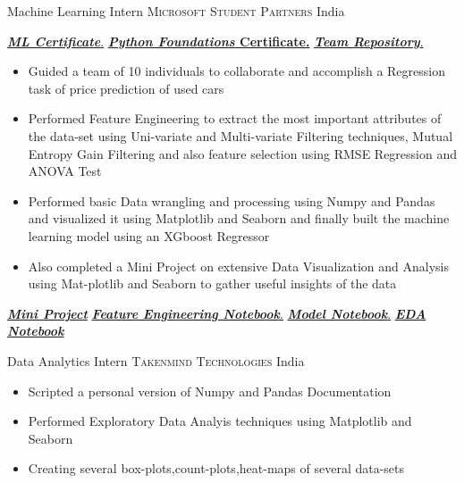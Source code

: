 \documentclass[11pt,a4paper,sans]{moderncv} %
\begin{document}
{Machine Learning Intern}
{\textsc{Microsoft Student Partners}}
{India}
{}
{
\href{https://github.com/teetangh/Kaustav-All-Certifications/blob/master/Artificial\%20Intelligence/MSP\%20ML\%20Internship/internship\%20certificate.pdf}{ \textbf{\emph{ML Certificate}}.}
\href{https://github.com/teetangh/Kaustav-All-Certifications/blob/master/Artificial\%20Intelligence/MSP\%20ML\%20Internship/Course\%20Completion\%20Certificate.pdf}{ \textbf{\emph{Python Foundations} Certificate.}}
\href{https://github.com/Microsoft-ML-Internship-Team/Major-Project-Submissions}{ \textbf{\emph{Team Repository}}.}
\begin{itemize}
    \item {Guided a team of 10 individuals to collaborate and accomplish a Regression task of price prediction of used cars}
    \item {Performed Feature Engineering to extract the most important attributes of the data-set using Uni-variate and Multi-variate Filtering techniques, Mutual Entropy Gain Filtering and also feature selection using RMSE Regression and ANOVA Test}
    \item {Performed basic Data wrangling and processing using Numpy and Pandas and visualized it using Matplotlib and Seaborn and finally built the machine learning model using an XGboost Regressor}
    \item {Also completed a Mini Project on extensive Data Visualization and Analysis using Mat-plotlib and Seaborn to gather useful insights of the data}
\end{itemize}
\href{https://github.com/teetangh/Microsoft-Machine-Learning-Internship/blob/master/MINOR\%20PROJECT/Microsoft_Minor_Project_v2.ipynb}{\textbf{\emph{Mini Project}}}
\href{https://github.com/Microsoft-ML-Internship-Team/Major-Project-Submissions/blob/master/KAUSTAV/02_Kaustav_feature_engineering_v4.ipynb}{\textbf{\emph{ Feature Engineering Notebook}}.}
\href{https://github.com/Microsoft-ML-Internship-Team/Major-Project-Submissions/blob/master/KAUSTAV/03_Kaustav_Buidling_the_model_v1.ipynb}{\textbf{\emph{ Model Notebook}}.}
\href{https://github.com/Microsoft-ML-Internship-Team/Major-Project-Submissions/blob/master/KAUSTAV/01_Kaustav_data_preprocess_EDA_v7.ipynb}{\textbf{\emph{ EDA Notebook}}}
}


{Data Analytics Intern}
{\textsc{Takenmind Technologies}}
{India}
{}
{
\begin{itemize}
    \item{Scripted a personal version of Numpy and Pandas Documentation }
    \item{Performed Exploratory Data Analyis techniques using Matplotlib and Seaborn }
    \item{Creating several box-plots,count-plots,heat-maps of several data-sets}
\end{itemize}
}
\end{document}
